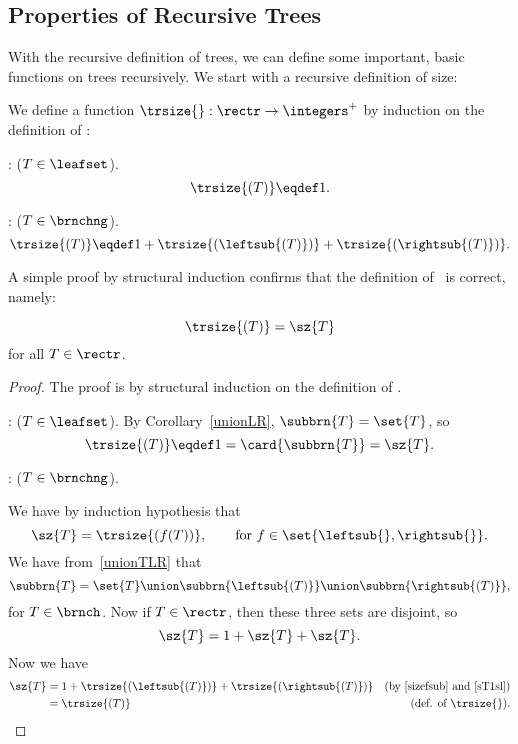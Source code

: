 \begin{definition}
\subsection{Properties of Recursive Trees}
With the recursive definition of trees, we can define some important,
basic functions on trees recursively.  We start with a recursive
definition of size:
\begin{definition}
We define a function $\trsize{}: \rectr \to \integers^+$ by induction on
the definition of \rectr:

: ($T \in \leafset$).
\[
\trsize{(T)} \eqdef 1.
\]

: ($T \in \brnchng$).
\[
\trsize{(T)} \eqdef 1 + \trsize{(\leftsub{(T)})} + \trsize{(\rightsub{(T)})}.
\]
\end{definition}

A simple proof by structural induction confirms that the definition of
\trsize{}\ is correct, namely:
\begin{lemma}\label{}
\[
\trsize{(T)} = \sz{T}
\]
for all $T \in \rectr$.

\begin{proof}
The proof is by structural induction on the definition of \rectr.

: ($T \in \leafset$).
By Corollary~\ref{unionLR}, $\subbrn{T} = \set{T}$, so
\[
\trsize{(T)} \eqdef 1 = \card{\subbrn{T}} = \sz{T}.
\]

: ($T \in\brnchng$).

We have by induction hypothesis that
\begin{equation}\label{sizefsub}
\sz{T} = \trsize{(f(T))}, \qquad \text{for}\ f \in
\set{\leftsub{}, \rightsub{}}.
\end{equation}
We have from~\ref{unionTLR} that
\[
\subbrn{T} = \set{T} \union \subbrn{\leftsub{(T)}} \union \subbrn{\rightsub{(T)}},
\]
for $T \in \brnch$.  Now if $T \in \rectr$, then these three sets are disjoint, so
\begin{equation}\label{sT1sl}
\sz{T} = 1 + \sz{T} + \sz{T}.
\end{equation}
Now we have
\begin{align*}
\sz{T}
 & = 1 + \trsize{(\leftsub{(T)})} + \trsize{(\rightsub{(T)})}
   & \text{(by~\eqref{sizefsub} and~\eqref{sT1sl})}\\
 & = \trsize{(T)} 
   & \text{(def. of \trsize{})}.
\end{align*}
\end{proof}
\end{lemma}


\end{definition}

